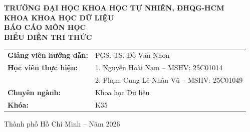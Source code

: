 \documentclass[11pt,a4paper]{report}
\begin{document}
\begin{titlepage}
    \centering
    \vspace*{0.5cm}
    {\Large\bfseries TRƯỜNG ĐẠI HỌC KHOA HỌC TỰ NHIÊN, ĐHQG-HCM}\\[0.3cm]
    {\large\bfseries KHOA KHOA HỌC DỮ LIỆU}\\[1.5cm]

    {\Large\bfseries BÁO CÁO MÔN HỌC}\\[0.3cm]
    {\Huge\bfseries\color{navyblue} BIỂU DIỄN TRI THỨC}\\[0.8cm]

    \begin{center}
    \end{center}

    \vspace{1.2cm}

    \begin{minipage}{0.85\textwidth}
        \large
        \begin{tabular}{ll}
            \textbf{Giảng viên hướng dẫn:} & PGS. TS. Đỗ Văn Nhơn \\[0.3cm]
            \textbf{Học viên thực hiện:} & 1. Nguyễn Hoài Nam -- MSHV: 25C01014 \\[0.15cm]
            & 2. Phạm Cung Lê Nhân Vũ -- MSHV: 25C01049 \\[0.3cm]
            \textbf{Chuyên ngành:} & Khoa học Dữ liệu \\[0.15cm]
            \textbf{Khóa:} & K35
        \end{tabular}
    \end{minipage}

    \vfill
    {\large Thành phố Hồ Chí Minh -- Năm 2026}
\end{titlepage}

\setcounter{page}{1}
\end{document}
